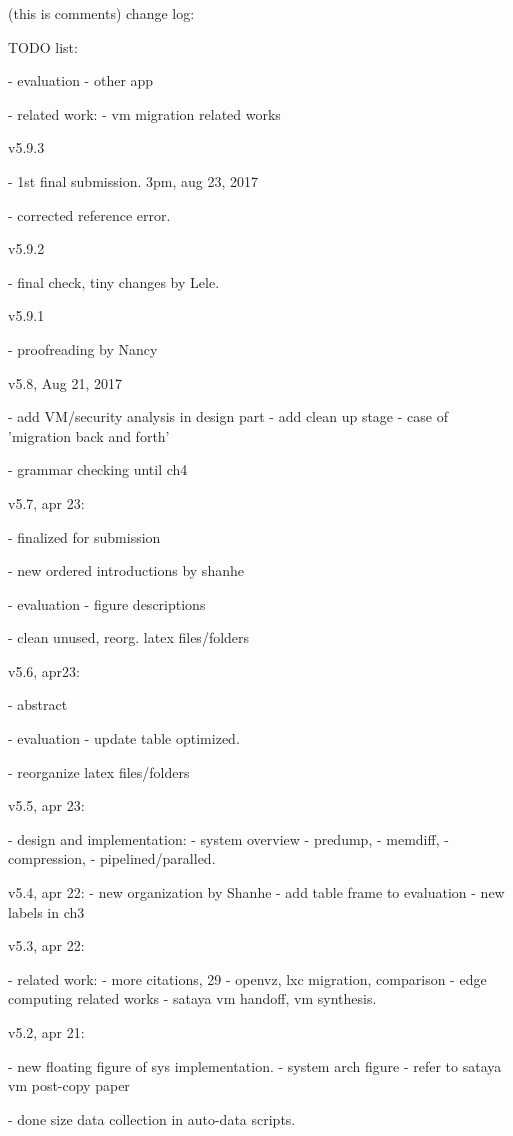 
\iffalse
(this is comments) change log:

TODO list:

 - evaluation
     - other app
 
 - related work:
    - vm migration related works

v5.9.3

 - 1st final submission. 3pm, aug 23, 2017
 
 - corrected reference error.
 
v5.9.2

 - final check, tiny changes by Lele.
 
v5.9.1

 - proofreading by Nancy

v5.8, Aug 21, 2017

 - add VM/security analysis in design part
 - add clean up stage
 - case of 'migration back and forth'
 
 - grammar checking until ch4
 
v5.7, apr 23:

 - finalized for submission

 - new ordered introductions by shanhe
 
 - evaluation
     - figure descriptions
     
 - clean unused, reorg. latex files/folders
 
    
v5.6, apr23:
    
 - abstract
 
 - evaluation
     - update table optimized.
     
 - reorganize latex files/folders

v5.5, apr 23:

    - design and implementation:
        - system overview
        - predump, 
        - memdiff, 
        - compression, 
        - pipelined/paralled.

v5.4, apr 22:
    - new organization by Shanhe
    - add table frame to evaluation
    - new labels in ch3
    
v5.3, apr 22:

 - related work:
    - more citations, 29
    - openvz, lxc migration, comparison
    - edge computing related works
    - sataya vm handoff, vm synthesis. 
    


v5.2, apr 21:

 - new floating figure of sys implementation.
    - system arch figure
    - refer to sataya vm post-copy paper
    
 - done size data collection in auto-data scripts.

